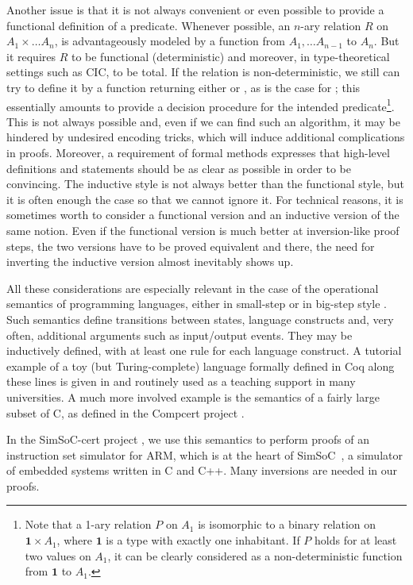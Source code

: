 Another issue is that it is not always convenient or even possible to
provide a functional definition of a predicate.
Whenever possible,
an $n$-ary relation $R$ on $A_1 \times \ldots A_n$, %
is advantageously modeled by a function from $A_1, \ldots A_{n-1}$ to $A_n$.
But it requires $R$ to be functional (deterministic) and moreover,
in type-theoretical settings such as CIC, to be total.
If the relation is non-deterministic,
we still can try to 
define it by a function returning either 
or , as is the case for ;
this essentially amounts to provide a decision procedure for 
the intended predicate\footnote{
Note that a 1-ary relation $P$ on $A_1$ is isomorphic to a 
binary relation on $\mathbf{1}\times A_1$,
where $\mathbf{1}$ is a type with exactly one inhabitant.
If $P$ holds for at least two values on $A_1$, 
it can be clearly considered as a non-deterministic 
function from $\mathbf{1}$ to $A_1$.
}.
This is not always possible and, even if we can find such an
algorithm, it may be hindered by undesired encoding tricks,
which will induce additional complications in proofs. 
Moreover, a requirement of formal methods expresses that
high-level definitions and statements should be as clear 
as possible in order to be convincing. 
The inductive style is not always better than the functional
style, but it is often enough the case so that we cannot
ignore it. 
For technical reasons, it is sometimes worth to consider
a functional version and an inductive version of the same notion.
Even if the functional version is much better at inversion-like
proof steps, 
the two versions have to be proved equivalent and there,
the need for inverting the inductive version almost inevitably shows up.


All these considerations are especially relevant in the case
of the operational semantics of programming languages,
either in small-step or in big-step style \cite{nielson}. 
Such semantics define transitions between states,
language constructs and,
very often, additional arguments such as input/output events. 
They may be inductively defined, 
with at least one rule for each language construct. 
A tutorial example of a toy (but Turing-complete) language 
formally defined in Coq along these lines
is given in \cite{Pierce:SF}
and routinely used as a teaching support in many universities.
A much more involved example
is the semantics of a fairly large subset of C, as defined in 
the Compcert project \cite{Leroy-Compcert-CACM}.

In the SimSoC-cert project \cite{cpp11}, 
we use this semantics to perform proofs of 
an instruction set simulator for ARM,
which is at the heart of SimSoC~\cite{rapido11}, 
a simulator of embedded systems written in C and C++.
Many inversions are needed in our proofs.

